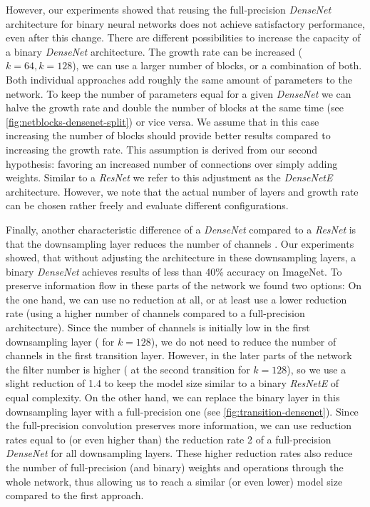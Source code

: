 \documentclass[10pt,twocolumn,letterpaper]{article}
\newcommand{\architecture}[1]{\emph{#1}}
\newcommand{\arch}[1]{\emph{#1}}
\begin{document}
However, our experiments showed that reusing the full-precision \architecture{DenseNet} architecture for binary neural networks does not achieve satisfactory performance, even after this change.
There are different possibilities to increase the capacity of a binary \architecture{DenseNet} architecture.
The growth rate can be increased (\eg$k=64, k=128$), we can use a larger number of blocks, or a combination of both.
Both individual approaches add roughly the same amount of parameters to the network.
To keep the number of parameters equal for a given \architecture{DenseNet} we can halve the growth rate and double the number of blocks at the same time (see \autoref{fig:netblocks-densenet-split}) or vice versa.
We assume that in this case increasing the number of blocks should provide better results compared to increasing the growth rate. 
This assumption is derived from our second hypothesis: favoring an increased number of connections over simply adding weights.
Similar to a \arch{ResNet} we refer to this adjustment as the \architecture{DenseNetE} architecture.
However, we note that the actual number of layers and growth rate can be chosen rather freely and evaluate different configurations.

Finally, another characteristic difference of a \arch{DenseNet} compared to a \arch{ResNet} is that the downsampling layer reduces the number of channels \cite{Huang2016}.
Our experiments showed, that without adjusting the architecture in these downsampling layers, a binary \architecture{DenseNet} achieves results of less than 40\% accuracy on ImageNet.
To preserve information flow in these parts of the network we found two options:
On the one hand, we can use no reduction at all, or at least use a lower reduction rate (using a higher number of channels compared to a full-precision architecture).
Since the number of channels is initially low in the first downsampling layer ( for $k=128$), we do not need to reduce the number of channels in the first transition layer.
However, in the later parts of the network the filter number is higher ( at the second transition for $k=128$), so we use a slight reduction of 1.4 to keep the model size similar to a binary \architecture{ResNetE} of equal complexity.
On the other hand, we can replace the binary layer in this downsampling layer with a full-precision one (see \autoref{fig:transition-densenet}).
Since the full-precision convolution preserves more information, we can use reduction rates equal to (or even higher than) the reduction rate 2 of a full-precision \arch{DenseNet} for all downsampling layers.
These higher reduction rates also reduce the number of full-precision (and binary) weights and operations through the whole network, thus allowing us to reach a similar (or even lower) model size compared to the first approach.
\end{document}
